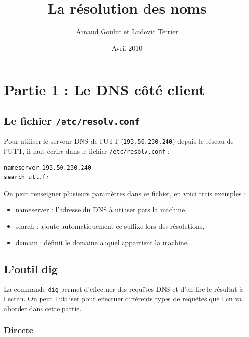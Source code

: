 \documentclass[12pt,a4paper,notitlepage]{article}
\begin{document}
\title{La résolution des noms}
\author{Arnaud Goulut et Ludovic Terrier}
\date{Avril 2010}
\maketitle



\thispagestyle{empty}




\section{Partie 1 : Le DNS côté client}

\subsection{Le fichier \texttt{/etc/resolv.conf}}
Pour utiliser le serveur DNS de l'UTT (\texttt{193.50.230.240}) depuis le réseau de l'UTT, il faut écrire dans le fichier \texttt{/etc/resolv.conf} : \\

\begin{lstlisting}[title=Contenu du fichier resolv.conf]
nameserver 193.50.230.240
search utt.fr
\end{lstlisting}

\bigskip
On peut renseigner plusieurs paramètres dans ce fichier, en voici trois exemples :
\begin{itemize}
\item nameserver : l'adresse du DNS à utiliser pars la machine,
\item search : ajoute automatiquement ce suffixe lors des résolutions,
\item domain : définit le domaine auquel appartient la machine.
\end{itemize}


\subsection{L'outil dig}
La commande \texttt{dig} permet d'effectuer des requêtes DNS et d'en lire le résultat à l'écran. On peut l'utiliser pour effectuer différents types de requêtes que l'on va aborder dans cette partie.

\subsubsection{Directe}
\end{document}
